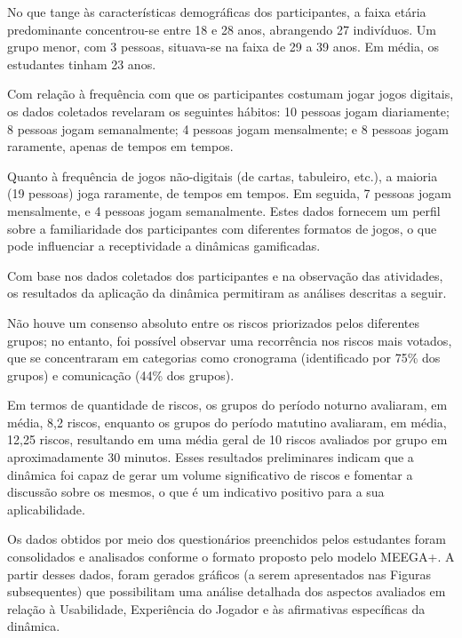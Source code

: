 \documentclass[
	12pt,
	openright,
	twoside,
	a4paper,
	english,
	brazil
	]{abntex2}
\begin{document}
No que tange às características demográficas dos participantes, a faixa etária predominante concentrou-se entre 18 e 28 anos, abrangendo 27 indivíduos. Um grupo menor, com 3 pessoas, situava-se na faixa de 29 a 39 anos. Em média, os estudantes tinham 23 anos.

Com relação à frequência com que os participantes costumam jogar jogos digitais, os dados coletados revelaram os seguintes hábitos: 10 pessoas jogam diariamente; 8 pessoas jogam semanalmente; 4 pessoas jogam mensalmente; e 8 pessoas jogam raramente, apenas de tempos em tempos.

Quanto à frequência de jogos não-digitais (de cartas, tabuleiro, etc.), a maioria (19 pessoas) joga raramente, de tempos em tempos. Em seguida, 7 pessoas jogam mensalmente, e 4 pessoas jogam semanalmente. Estes dados fornecem um perfil sobre a familiaridade dos participantes com diferentes formatos de jogos, o que pode influenciar a receptividade a dinâmicas gamificadas.

Com base nos dados coletados dos participantes e na observação das atividades, os resultados da aplicação da dinâmica permitiram as análises descritas a seguir.

Não houve um consenso absoluto entre os riscos priorizados pelos diferentes grupos; no entanto, foi possível observar uma recorrência nos riscos mais votados, que se concentraram em categorias como cronograma (identificado por 75\% dos grupos) e comunicação (44\% dos grupos).

Em termos de quantidade de riscos, os grupos do período noturno avaliaram, em média, 8,2 riscos, enquanto os grupos do período matutino avaliaram, em média, 12,25 riscos, resultando em uma média geral de 10 riscos avaliados por grupo em aproximadamente 30 minutos. Esses resultados preliminares indicam que a dinâmica foi capaz de gerar um volume significativo de riscos e fomentar a discussão sobre os mesmos, o que é um indicativo positivo para a sua aplicabilidade.

Os dados obtidos por meio dos questionários preenchidos pelos estudantes foram consolidados e analisados conforme o formato proposto pelo modelo MEEGA+. A partir desses dados, foram gerados gráficos (a serem apresentados nas Figuras subsequentes) que possibilitam uma análise detalhada dos aspectos avaliados em relação à Usabilidade, Experiência do Jogador e às afirmativas específicas da dinâmica.

\end{document}
